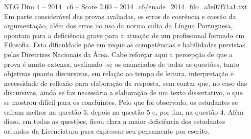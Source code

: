 \begin{textsample}{NEG Dim 4 – 2014\_c6 – Score 2.00 – 2014\_c6/enade\_2014\_filo\_a5e07f71a1.txt}
Em parte considerável das provas avaliadas, os erros de coerência e coesão da argumentação, além dos erros no uso da norma culta da Língua Portuguesa, apontam para a deficiência grave para a atuação de um profissional formado em Filosofia.
Esta dificuldade põe em xeque as competências e habilidades previstas pelas Diretrizes Nacionais da Área.
Cabe reforçar aqui a percepção de que a prova é muito extensa, avaliando -se os enunciados de todas as questões, tanto objetivas quanto discursivas, em relação ao tempo de leitura, interpretação e necessidade de reflexão para elaboração da resposta, sem contar que, no caso das discursivas, ainda se faz necessária a elaboração de um texto dissertativo, o que se mostrou difícil para os concluintes.
Pelo que foi observado, os estudantes se saíram melhor na questão 3, depois na questão 5 e, por fim, na questão 4.
Além disso, em todas as questões, ficou clara a maior deficiência dos estudantes oriundos da Licenciatura para expressar seu pensamento por escrito.

\end{textsample}
